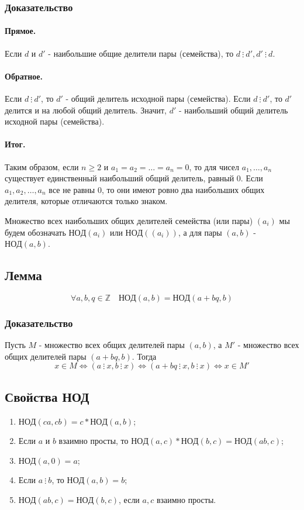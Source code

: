 \documentclass{article}
\newcommand{\cgcd}{\mathrm{НОД}}
\newcommand{\divs}{~\vdots~}
\begin{document}
\subsubsection*{Доказательство}
\paragraph{Прямое.}
Если $d$ и $d'$ - наибольшие общие делители пары (семейства), то $d \divs d', d' \divs d$.

\paragraph{Обратное.}
Если $d \divs d'$, то $d'$ - общий делитель исходной пары (семейства). Если $d \divs d'$, то $d'$ делится и на любой общий делитель. Значит, $d'$ - наибольший общий делитель исходной пары (семейства).

\paragraph{Итог.}
Таким образом, если $n \geq 2$ и $a_1 = a_2 = \dots = a_n = 0$, то для чисел $a_1, \dots, a_n$ существует единственный наибольший общий делитель, равный $0$. Если $a_1, a_2, \dots, a_n$ все не равны $0$, то они имеют ровно два наибольших общих делителя, которые отличаются только знаком.

Множество всех наибольших общих делителей семейства (или пары) $(a_i)$ мы будем обозначать $\cgcd(a_i)$ или $\cgcd((a_i))$, а для пары $(a, b)$ - $\cgcd(a, b)$.

\subsection{Лемма}
\[\forall a, b, q \in \mathbb Z \quad \cgcd(a, b) = \cgcd(a + bq, b)\]
\subsubsection*{Доказательство}
Пусть $M$ - множество всех общих делителей пары $(a, b)$, а $M'$ - множество всех общих делителей пары $(a + bq, b)$. Тогда
\[x \in M \Leftrightarrow (a \divs x, b \divs x) \Leftrightarrow (a + bq \divs x, b \divs x) \Leftrightarrow x \in M'\]

\subsection{Свойства НОД}
\begin{enumerate}
\item $\cgcd(ca, cb) = c * \cgcd(a, b)$;
\item Если $a$ и $b$ взаимно просты, то $\cgcd(a, c) * \cgcd(b, c) = \cgcd(ab, c)$;
\item $\cgcd(a, 0) = a$;
\item Если $a \divs b$, то $\cgcd(a, b) = b$;
\item $\cgcd(ab, c) = \cgcd(b, c)$, если $a, c$ взаимно просты.
\end{enumerate}
\end{document}
